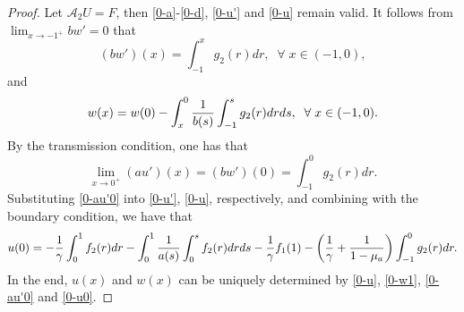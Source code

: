 \documentclass[10pt,a4paper]{amsart}
\begin{document}
\begin{proof}
Let $\mathcal A_2 U= F$, then \eqref{0-a}-\eqref{0-d}, \eqref{0-u'} and \eqref{0-u} remain valid. It follows from $\lim_{x\rightarrow -1^+} bw'= 0$ that
\begin{equation}
	(bw')(x) = \int_{-1}^x g_2(r)dr,\;\;\forall\;x\in(-1,0),
\end{equation}
and
\begin{equation}\label{0-w1}
	w(x) = w(0) - \int_x^0{1\over b(s)}\int_{-1}^s g_2(r) drds,\;\;\forall\;x\in(-1,0).
\end{equation}
By the transmission condition, one has that
\begin{equation}\label{0-au'0}
	\lim_{x\to0^+}(au')(x) = (bw')(0) = \int_{-1}^0 g_2(r)dr.
\end{equation}
Substituting \eqref{0-au'0} into \eqref{0-u'}, \eqref{0-u}, respectively, and combining with the boundary condition, we have that
\begin{equation}\label{0-u0}
	\begin{split}
		u(0) = -{1\over\gamma} \int_0^1 f_2(r)dr - \int_0^1 {1\over a(s)}\int_0^s f_2(r)dr ds
		- {1\over\gamma} f_1(1)-\left({1\over\gamma} + {1\over1-\mu_a}\right)\int_{-1}^0 g_2(r)dr.
	\end{split}
\end{equation}
In the end, $u(x)$ and $w(x)$ can be  uniquely determined by \eqref{0-u}, \eqref{0-w1}, \eqref{0-au'0} and \eqref{0-u0}.
\end{proof}
\end{document}
